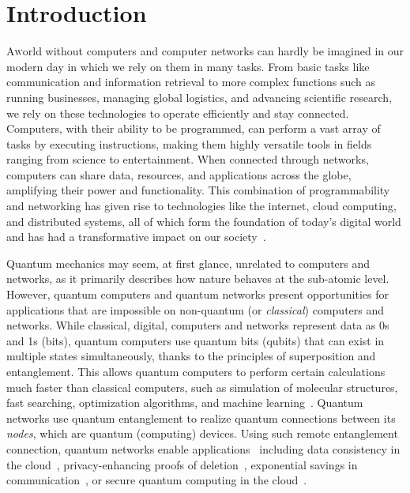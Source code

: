 \chapter{Introduction}
\label{chp:intro}

\lettrine{A} world without computers and computer networks can hardly be imagined in our modern day in which we rely on them in many tasks.
From basic tasks like communication and information retrieval to more complex functions such as running businesses, managing global logistics, and advancing scientific research, we rely on these technologies to operate efficiently and stay connected.
Computers, with their ability to be programmed, can perform a vast array of tasks by executing instructions, making them highly versatile tools in fields ranging from science to entertainment.
When connected through networks, computers can share data, resources, and applications across the globe, amplifying their power and functionality.
This combination of programmability and networking has given rise to technologies like the internet, cloud computing, and distributed systems, all of which form the foundation of today's digital world and has had a transformative impact on our society~\cite{castells_impact_2013}.

Quantum mechanics may seem, at first glance, unrelated to computers and networks, as it primarily describes how nature behaves at the sub-atomic level.
However, quantum computers and quantum networks present opportunities for applications that are impossible on non-quantum (or \emph{classical}) computers and networks.
While classical, digital, computers and networks represent data as 0s and 1s (bits), quantum computers use quantum bits (qubits) that can exist in multiple states simultaneously, thanks to the principles of superposition and entanglement.
This allows quantum computers to perform certain calculations much faster than classical computers, such as simulation of molecular structures, fast searching, optimization algorithms, and machine learning~\cite{montanaro_quantum_2016, dalzell_quantum_2023}.
Quantum networks use quantum entanglement to realize quantum connections between its \emph{nodes}, which are quantum (computing) devices.
Using such remote entanglement connection, quantum networks enable applications~\cite{wehner_2018_stages} including data consistency in the cloud~\cite{benor_2005_byzantine}, privacy-enhancing proofs of deletion~\cite{poremba_quantum_2022}, exponential savings in communication~\cite{guerin_exponential_2016}, or secure quantum computing in the cloud~\cite{broadbent_2009_ubqc,childs_2005_secure_qc}.

